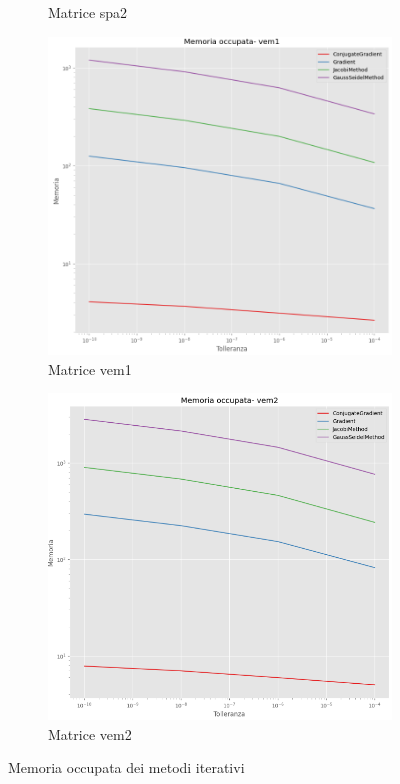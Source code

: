 \begin{figure}[!ht]
\begin{subfigure}{0.45\textwidth}
        \caption{Matrice spa2}
        \label{fig:mem_spa2}
    \end{subfigure}
    \begin{subfigure}{0.45\textwidth}
        \centering
        \includegraphics[width=\textwidth]{./img/mem_vem1.png}
        \caption{Matrice vem1}
        \label{fig:mem_vem1}
    \end{subfigure}
    \begin{subfigure}{0.45\textwidth}
        \centering
        \includegraphics[width=\textwidth]{./img/mem_vem2.png}
        \caption{Matrice vem2}
        \label{fig:mem_vem2}
    \end{subfigure}
    \caption{Memoria occupata dei metodi iterativi}
    \label{fig:memory}
\end{figure}

